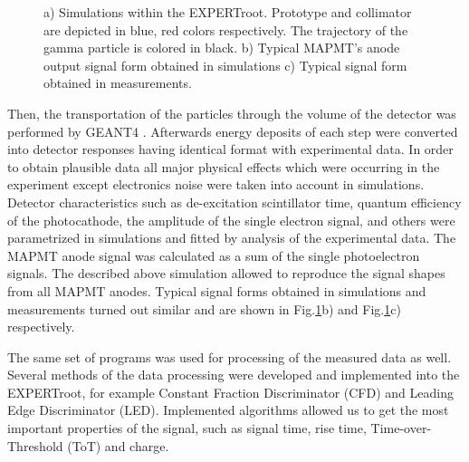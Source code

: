 \documentclass{webofc}
\newcommand{\er}{\textmd{EXPERTroot}}
\begin{document}
\begin{figure}
\begin{minipage}[h]{0.35\linewidth}
		\end{minipage} 
		\caption{a) Simulations within the \er. Prototype and collimator are depicted in blue, red colors respectively. The trajectory of the gamma particle is colored in black. b) Typical MAPMT's anode output signal form obtained in simulations c) Typical signal form obtained in measurements.} 
		\label{ris:sim} 
	\end{figure}
Then, the transportation of the particles through the volume of the detector was performed by GEANT4 \cite{geant4}. Afterwards energy deposits of each step were converted into detector responses having identical format with experimental data.
In order to obtain plausible data all major physical effects which were occurring in the experiment except electronics noise were taken into account in simulations.
Detector characteristics such as de-excitation scintillator time, quantum efficiency of the photocathode, the amplitude of the single electron signal, and others were parametrized in simulations and fitted by analysis of the experimental data.
The MAPMT anode signal was calculated as a sum of the single photoelectron signals.
The described above simulation allowed  to reproduce the signal shapes from all MAPMT anodes.
Typical signal forms obtained in simulations and measurements turned out similar and are shown in Fig.\ref{ris:sim}b) and Fig.\ref{ris:sim}c) respectively.
	

The same set of programs was used for processing of the measured data as well. Several methods of the data processing were developed and implemented into the \er, for example Constant Fraction Discriminator (CFD) and Leading Edge Discriminator (LED). Implemented algorithms allowed us to get the most important properties of the signal, such as signal time, rise time, Time-over-Threshold (ToT) and charge.

\end{document}
